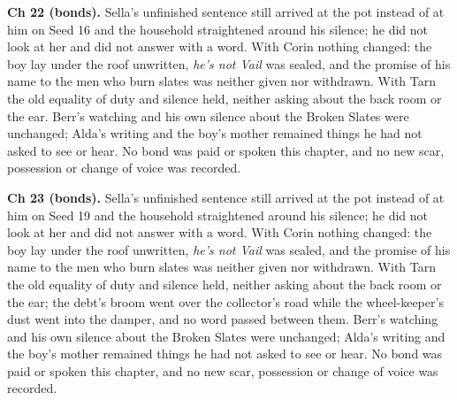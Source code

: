 \documentclass{design/chronicle}
\begin{document}
{\textbf{Ch 22 (bonds).} Sella’s unfinished sentence still arrived at the pot instead of at him on Seed 16 and the household straightened around his silence; he did not look at her and did not answer with a word. With Corin nothing changed: the boy lay under the roof unwritten, \emph{he’s not Vail} was sealed, and the promise of his name to the men who burn slates was neither given nor withdrawn. With Tarn the old equality of duty and silence held, neither asking about the back room or the ear. Berr’s watching and his own silence about the Broken Slates were unchanged; Alda’s writing and the boy’s mother remained things he had not asked to see or hear. No bond was paid or spoken this chapter, and no new scar, possession or change of voice was recorded.

\textbf{Ch 23 (bonds).} Sella’s unfinished sentence still arrived at the pot instead of at him on Seed 19 and the household straightened around his silence; he did not look at her and did not answer with a word. With Corin nothing changed: the boy lay under the roof unwritten, \emph{he’s not Vail} was sealed, and the promise of his name to the men who burn slates was neither given nor withdrawn. With Tarn the old equality of duty and silence held, neither asking about the back room or the ear; the debt’s broom went over the collector’s road while the wheel-keeper’s dust went into the damper, and no word passed between them. Berr’s watching and his own silence about the Broken Slates were unchanged; Alda’s writing and the boy’s mother remained things he had not asked to see or hear. No bond was paid or spoken this chapter, and no new scar, possession or change of voice was recorded.

}
\end{document}
